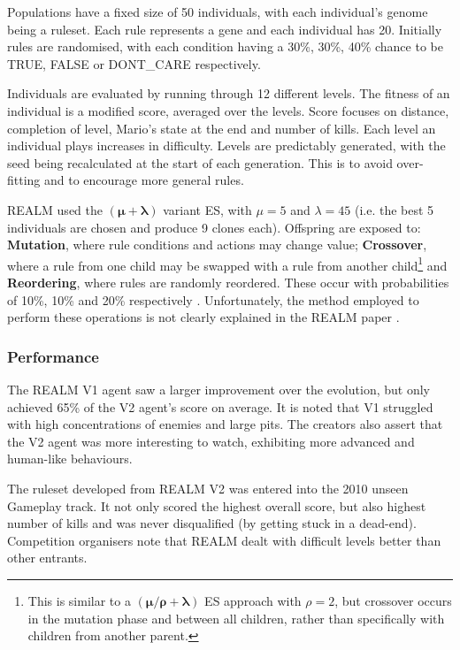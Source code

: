 Populations have a fixed size of 50 individuals, with each individual's genome being a ruleset. Each rule represents a gene and each individual has 20. Initially rules are randomised, with each condition having a 30\%, 30\%, 40\% chance to be {\footnotesize TRUE}, {\footnotesize FALSE} or {\footnotesize DONT\_CARE} respectively.

Individuals are evaluated by running through 12 different levels. The fitness of an individual is a modified score, averaged over the levels. Score focuses on distance, completion of level, Mario's state at the end and number of kills. Each level an individual plays increases in difficulty. Levels are predictably generated, with the seed being recalculated at the start of each generation. This is to avoid over-fitting and to encourage more general rules.

REALM used the $\pmb{(\mu  + \lambda)}$ variant ES, with $\mu = 5$ and $\lambda = 45$ (i.e. the best 5 individuals are chosen and produce 9 clones each). Offspring are exposed to: \textbf{Mutation}, where rule conditions and actions may change value; \textbf{Crossover}, where a rule from one child may be swapped with a rule from another child\footnote{This is similar to a  $\pmb{(\mu/\rho  + \lambda)}$ ES approach with $\rho = 2$, but crossover occurs in the mutation phase and between all children, rather than specifically with children from another parent.} and \textbf{Reordering}, where rules are randomly reordered. These occur with probabilities of 10\%, 10\% and 20\% respectively \cite[p.~88]{realm}. Unfortunately, the method employed to perform these operations is not clearly explained in the REALM paper \cite{realm}.

\subsubsection*{\hspace{6pt}Performance}

The REALM V1 agent saw a larger improvement over the evolution, but only achieved 65\% of the V2 agent's score on average. It is noted that V1 struggled with high concentrations of enemies and large pits. The creators also assert that the V2 agent was more interesting to watch, exhibiting more advanced and human-like behaviours. \cite[pp.~89-90]{realm}

The ruleset developed from REALM V2 was entered into the 2010 unseen Gameplay track. It not only scored the highest overall score, but also highest number of kills and was never disqualified (by getting stuck in a dead-end). Competition organisers note that REALM dealt with difficult levels better than other entrants. \cite[p.~10]{2012the}


